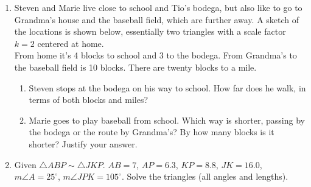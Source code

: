 \begin{enumerate}
\item Steven and Marie live close to school and Tio's bodega, but also like to go to Grandma's house and the baseball field, which are further away. A sketch of the locations is shown below, essentially two triangles with a scale factor $k=2$ centered at home.\\[0.25cm]
From home it's 4 blocks to school and 3 to the bodega. From Grandma's to the baseball field is 10 blocks. There are twenty blocks to a mile.
\begin{enumerate}
  \item Steven stops at the bodega on his way to school. How far does he walk, in terms of both blocks and miles?
\begin{flushright}
\end{flushright} 
  \item Marie goes to play baseball from school. Which way is shorter, passing by the bodega or the route by Grandma's? By how many blocks is it shorter? Justify your answer.
\end{enumerate}

\newpage
\item Given $\triangle ABP \sim \triangle JKP$. $AB=7$, $AP=6.3$, $KP=8.8$, $JK=16.0$, $m\angle A=25^\circ$, $m\angle JPK = 105^\circ$. Solve the triangles (all angles and lengths).
\begin{flushright}
\end{flushright} \vspace{2cm}
  

\end{enumerate}
